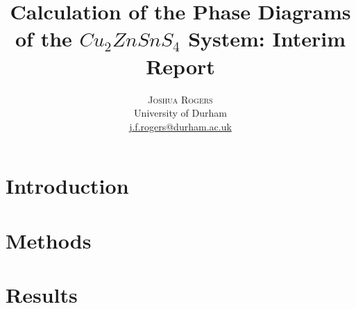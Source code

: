 \documentclass[11pt,a4paper,twoside]{article}
\title{\vspace{-15mm}\fontsize{24pt}{10pt}\selectfont\textbf{Calculation of the Phase Diagrams of the $Cu_2ZnSnS_4$ System: Interim Report}} %
\author{
\large
\textsc{Joshua Rogers}\\[2mm] %
\normalsize University of Durham \\ %
\normalsize \href{mailto:j.f.rogers@durham.ac.uk}{j.f.rogers@durham.ac.uk} %
\vspace{-5mm}
}
\date{}
\begin{document}
\maketitle %

\thispagestyle{fancy} %


\begin{abstract}

\noindent 

\end{abstract}



\section{Introduction}

\clearpage
\section{Methods}



\clearpage
\section{Results}



\clearpage
\appendix


\clearpage



\clearpage





\end{document}
